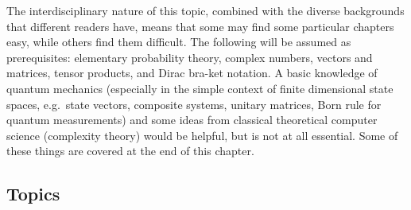 \documentclass[fleqn]{article}
\begin{document}
The interdisciplinary nature of this topic, combined with the diverse backgrounds that different readers have, means that some may find some particular chapters easy, while others find them difficult.
The following will be assumed as prerequisites: elementary probability theory, complex numbers, vectors and matrices, tensor products, and Dirac bra-ket notation.
A basic knowledge of quantum mechanics (especially in the simple context of finite dimensional state spaces, e.g.~state vectors, composite systems, unitary matrices, Born rule for quantum measurements) and some ideas from classical theoretical computer science (complexity theory) would be helpful, but is not at all essential.
Some of these things are covered at the end of this chapter.

\hypertarget{topics}{%
\subsection*{Topics}\label{topics}}
\end{document}
